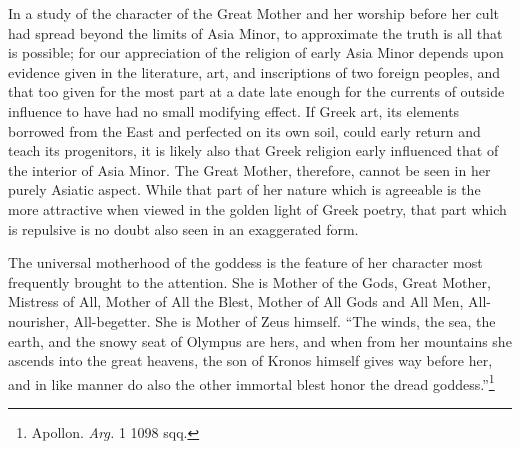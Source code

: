 \documentclass[a4paper, 11pt, oneside, polutonikogreek, english]{article}
\begin{document}
In a study of the character of the Great Mother and her worship before her cult had spread beyond the limits of Asia Minor, to approximate the truth is all that is possible; for our appreciation of the religion of early Asia Minor depends upon evidence given in the literature, art, and inscriptions of two foreign peoples, and that too given for the most part at a date late enough for the currents of outside influence to have had no small modifying effect. If Greek art, its elements borrowed from the East and perfected on its own soil, could early return and teach its progenitors, it is likely also that Greek religion early influenced that of the interior of Asia Minor. The Great Mother, therefore, cannot be seen in her purely Asiatic aspect. While that part of her nature which is agreeable is the more attractive when viewed in the golden light of Greek poetry, that part which is repulsive is no doubt also seen in an exaggerated form.

The universal motherhood of the goddess is the feature of her character most frequently brought to the attention. She is Mother of the Gods, Great Mother, Mistress of All, Mother of All the Blest, Mother of All Gods and All Men, All-nourisher, All-begetter. She is Mother of Zeus himself. ``The winds, the sea, the earth, and the snowy seat of Olympus are hers, and when from her mountains she ascends into the great heavens, the son of Kronos himself gives way before her, and in like manner do also the other immortal blest honor the dread goddess.''\footnote{Apollon. \emph{Arg.} 1 1098 sqq.}
\end{document}
